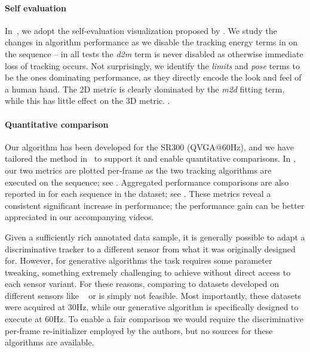 \paragraph{Self evaluation}
% 
In~, we adopt the self-evaluation visualization proposed by \cite{taylor2016concerto}. We study the changes in algorithm performance as we disable the tracking energy terms in  on the  sequence -- in all tests the \emph{d2m} term is never disabled as otherwise immediate loss of tracking occurs. Not surprisingly, we identify the \emph{limits} and \emph{pose} terms to be the ones dominating performance, as they directly encode the look and feel of a human hand. The 2D metric is clearly dominated by the \emph{m2d} fitting term, while this has little effect on the 3D metric. 
% 
.


\paragraph{Quantitative comparison}
Our algorithm has been developed for the \realsense{} SR300 (QVGA@60Hz), and we have tailored the method in~\cite{tagliasacchi2015robust} to support it and enable quantitative comparisons. In , our two metrics are plotted per-frame as the two tracking algorithms are executed on the  sequence; see . Aggregated performance comparisons are also reported in  for each sequence in the \handy{} dataset; see . These metrics reveal a consistent significant increase in performance; the performance gain can be better appreciated in our accompanying videos.

Given a sufficiently rich annotated data sample, it is generally possible to adapt a discriminative tracker to a different sensor from what it was originally designed for. However, for generative algorithms the task requires some parameter tweaking, something extremely challenging to achieve without direct access to each sensor variant. For these reasons, comparing to datasets developed on different sensors like \dexter{}~\cite{sridhar2013multicam} or \fingerpaint{} \cite{sharp2015accurate} is simply not feasible. Most importantly, these datasets were acquired at 30Hz, while our generative algorithm is specifically designed to execute at 60Hz. To enable a fair comparison we would require the discriminative per-frame re-initializer employed by the authors, but no sources for these algorithms are available.

